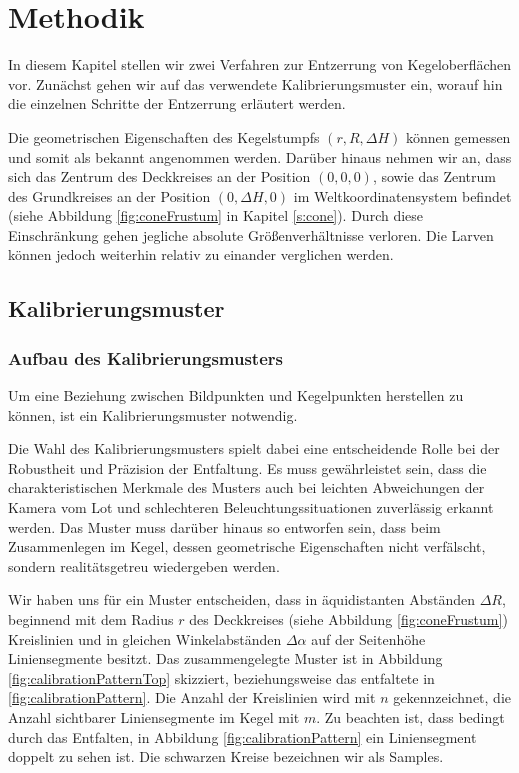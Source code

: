 \chapter{Methodik}
\label{ch:method}
In diesem Kapitel stellen wir zwei Verfahren zur Entzerrung von Kegeloberflächen vor.
Zunächst gehen wir auf das verwendete Kalibrierungsmuster ein, worauf hin die einzelnen Schritte der Entzerrung erläutert werden.

Die geometrischen Eigenschaften des Kegelstumpfs $(r, R, \Delta H)$ können gemessen und somit als bekannt angenommen werden.
Darüber hinaus nehmen wir an, dass sich das Zentrum des Deckkreises an der Position $(0,0,0)$, sowie das Zentrum des Grundkreises an der Position $(0,\Delta H, 0)$ im Weltkoordinatensystem befindet (siehe Abbildung \ref{fig:coneFrustum} in Kapitel \ref{s:cone}). Durch diese Einschränkung gehen jegliche absolute Größenverhältnisse verloren. Die Larven können jedoch weiterhin relativ zu einander verglichen werden.


\section{Kalibrierungsmuster}
\label{s:calibrationPattern}
\subsection{Aufbau des Kalibrierungsmusters}
Um eine Beziehung zwischen Bildpunkten und Kegelpunkten herstellen zu können, ist ein Kalibrierungsmuster notwendig.

Die Wahl des Kalibrierungsmusters spielt dabei eine entscheidende Rolle bei der Robustheit und Präzision der Entfaltung. Es muss gewährleistet sein, dass die charakteristischen Merkmale des Musters auch bei leichten Abweichungen der Kamera vom Lot und schlechteren Beleuchtungssituationen zuverlässig erkannt werden. Das Muster muss darüber hinaus so entworfen sein, dass beim Zusammenlegen im Kegel, dessen geometrische Eigenschaften nicht verfälscht, sondern realitätsgetreu wiedergeben werden.

Wir haben uns für ein Muster entscheiden, dass in äquidistanten Abständen $\Delta R$, beginnend mit dem Radius $r$ des Deckkreises (siehe Abbildung \ref{fig:coneFrustum}) Kreislinien und in gleichen Winkelabständen $\Delta \alpha$ auf der Seitenhöhe Liniensegmente besitzt. Das zusammengelegte Muster ist in Abbildung \ref{fig:calibrationPatternTop} skizziert, beziehungsweise das entfaltete in \ref{fig:calibrationPattern}. Die Anzahl der Kreislinien wird mit $n$ gekennzeichnet, die Anzahl sichtbarer Liniensegmente im Kegel mit $m$. Zu beachten ist, dass bedingt durch das Entfalten, in Abbildung \ref{fig:calibrationPattern}  ein Liniensegment doppelt zu sehen ist. Die schwarzen Kreise bezeichnen wir als Samples.

